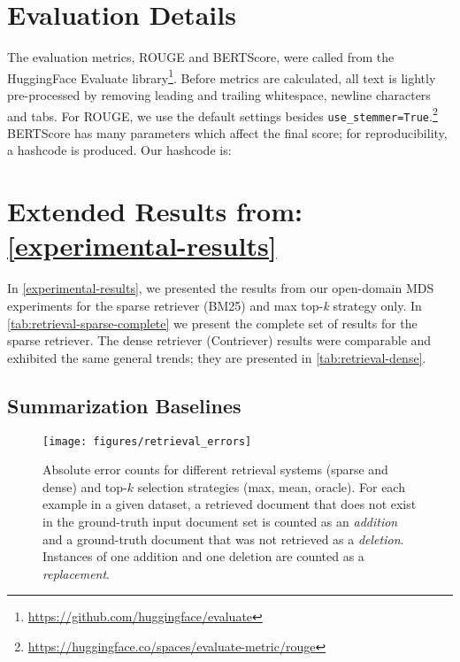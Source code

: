 \documentclass[11pt]{article}
\begin{document}
\section{Evaluation Details}
\label{appendix:evaluation-details}

The evaluation metrics, ROUGE and BERTScore, were called from the HuggingFace Evaluate library\footnote{\url{https://github.com/huggingface/evaluate}}. Before metrics are calculated, all text is lightly pre-processed by removing leading and trailing whitespace, newline characters and tabs. For ROUGE, we use the default settings besides \texttt{use\_stemmer=True}.\footnote{\url{https://huggingface.co/spaces/evaluate-metric/rouge}} BERTScore has many parameters which affect the final score; for reproducibility, a hashcode is produced. Our hashcode is: 


\section{Extended Results from: \autoref{experimental-results}}
\label{appendix:experimental-results}

In \textsection \ref{experimental-results}, we presented the results from our open-domain MDS experiments for the sparse retriever (BM25) and max top-\textit{k} strategy only. In \autoref{tab:retrieval-sparse-complete} we present the complete set of results for the sparse retriever. The dense retriever (Contriever) results were comparable and exhibited the same general trends; they are presented in \autoref{tab:retrieval-dense}.

\subsection{Summarization Baselines}
\label{appendix:summarization-baselines}

\begin{figure*}[t]
\centering
\texttt{[image: figures/retrieval\_errors]}
\caption{Absolute error counts for different retrieval systems (sparse and dense) and top-\(k\) selection strategies (max, mean, oracle). For each example in a given dataset, a retrieved document that does not exist in the ground-truth input document set is counted as an \textit{addition} and a ground-truth document that was not retrieved as a \textit{deletion}. Instances of one addition and one deletion are counted as a \textit{replacement}.}
\label{fig:retrieval-errors}
\end{figure*}
\end{document}
